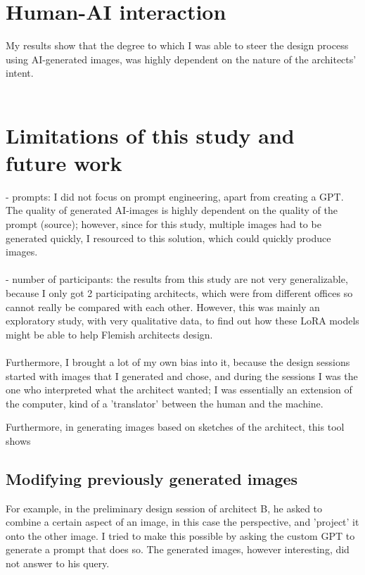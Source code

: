 \section{Human-AI interaction}

My results show that the degree to which I was able to steer the design process using AI-generated images, was highly dependent on the nature of the architects' intent.\\~\\

\section{Limitations of this study and future work}

- prompts: I did not focus on prompt engineering, apart from creating a GPT. The quality of generated AI-images is highly dependent on the quality of the prompt (source); however, since for this study, multiple images had to be generated quickly, I resourced to this solution, which could quickly produce images. \\~\\
- number of participants: the results from this study are not very generalizable, because I only got 2 participating architects, which were from different offices so cannot really be compared with each other. However, this was mainly an exploratory study, with very qualitative data, to find out how these LoRA models might be able to help Flemish architects design. \\~\\

Furthermore, I brought a lot of my own bias into it, because the design sessions started with images that I generated and chose, and during the sessions I was the one who interpreted what the architect wanted; I was essentially an extension of the computer, kind of a 'translator' between the human and the machine.



Furthermore, in generating images based on sketches of the architect, this tool shows

\subsection{Modifying previously generated images}
For example, in the preliminary design session of architect B, he asked to combine a certain aspect of an image, in this case the perspective, and 'project' it onto the other image. I tried to make this possible by asking the custom GPT to generate a prompt that does so. The generated images, however interesting, did not answer to his query. 
